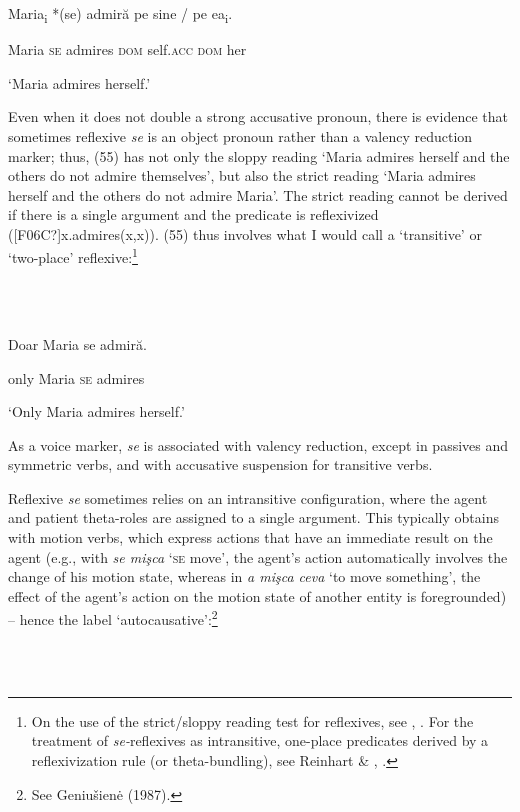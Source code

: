 \documentclass[output=paper]{langsci/langscibook}
\begin{document}
          Maria\textsubscript{i} *(se) admiră  pe    sine        / pe    ea\textsubscript{i}.

Maria     \textsc{se} admires \textsc{dom} self.\textsc{acc}  \textsc{dom} her

‘Maria admires herself.’

Even when it does not double a strong accusative pronoun, there is evidence that sometimes reflexive \textit{se} is an object pronoun rather than a valency reduction marker; thus, (55) has not only the sloppy reading ‘Maria admires herself and the others do not admire themselves’, but also the strict reading ‘Maria admires herself and the others do not admire Maria’. The strict reading cannot be derived if there is a single argument and the predicate is reflexivized ([F06C?]x.admires(x,x)). (55) thus involves what I would call a ‘transitive’ or ‘two-place’ reflexive:\footnote{On the use of the strict/sloppy reading test for reflexives, see \citet{SellsEtAl1987}, \citet{Labelle2008}. For the treatment of \textit{se-}reflexives as intransitive, one-place predicates derived by a reflexivization rule (or theta-bundling), see Reinhart \& \citet{Siloni2005}, \citet{Labelle2008}.}   

\ea%
    \label{ex:key:55}
    \gll\\
        \\
    \glt
    \z

          Doar  Maria se admiră.       

only   Maria \textsc{se} admires          

‘Only Maria admires herself.’

As a voice marker, \textit{se} is associated with valency reduction, except in passives and symmetric verbs, and with accusative suspension for transitive verbs.

  Reflexive \textit{se} sometimes relies on an intransitive configuration, where the agent and patient theta-roles are assigned to a single argument. This typically obtains with motion verbs, which express actions that have an immediate result on the agent (e.g., with \textit{se mişca} ‘\textsc{se} move’, the agent’s action automatically involves the change of his motion state, whereas in \textit{a mişca ceva} ‘to move something’, the effect of the agent’s action on the motion state of another entity is foregrounded) – hence the label ‘autocausative’:\footnote{See Geniušien\.e (1987).} 

\ea%
    \label{ex:key:56}
    \gll\\
        \\
    \glt
    \z
\end{document}
